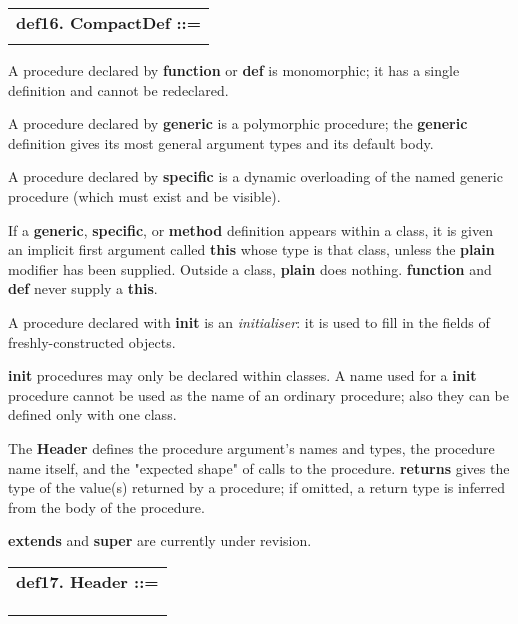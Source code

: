 \documentclass{report}
\begin{document}
\begin{tabular}{l}
{\bf def16. CompactDef ::= }\\ 
\hspace*{3mm}{\tt "def" Header ("=" $\mid$ "as" $\mid$ "=$>$") Expr} \\ 
\end{tabular}



A procedure declared by {\bf function} or {\bf def} is monomorphic; it has a single
definition and cannot be redeclared.

A procedure declared by {\bf generic} is a polymorphic procedure; the {\bf generic}
definition gives its most general argument types and its default body.

A procedure declared by {\bf specific} is a dynamic overloading of the named
generic procedure (which must exist and be visible).

If a {\bf generic}, {\bf specific}, or {\bf method} definition appears within a class, it
is given an implicit first argument called {\bf this} whose type is that class,
unless the {\bf plain} modifier has been supplied. Outside a class, {\bf plain} does
nothing. {\bf function} and {\bf def} never supply a {\bf this}.

A procedure declared with {\bf init} is an {\em initialiser}: it is used to fill in
the fields of freshly-constructed objects.

{\bf init} procedures may only be declared within classes. A name used
for a {\bf init} procedure cannot be used as the name of an ordinary
procedure; also they can be defined only with one class.

The {\bf Header} defines the procedure argument's names and types, the procedure
name itself, and the "expected shape" of calls to the procedure. {\bf returns}
gives the type of the value(s) returned by a procedure; if omitted, a return
type is inferred from the body of the procedure.

{\bf extends} and {\bf super} are currently under revision.

\begin{tabular}{l}
{\bf def17. Header ::= }\\ 
\hspace*{3mm}{\tt CallShape} \\ 
\hspace*{3mm}{\tt  $\mid$ Name "-$>$" CallShape} \\ 
\hspace*{3mm}{\tt  $\mid$ CallShape ":=" Arg} \\ 
\end{tabular}
\end{document}
